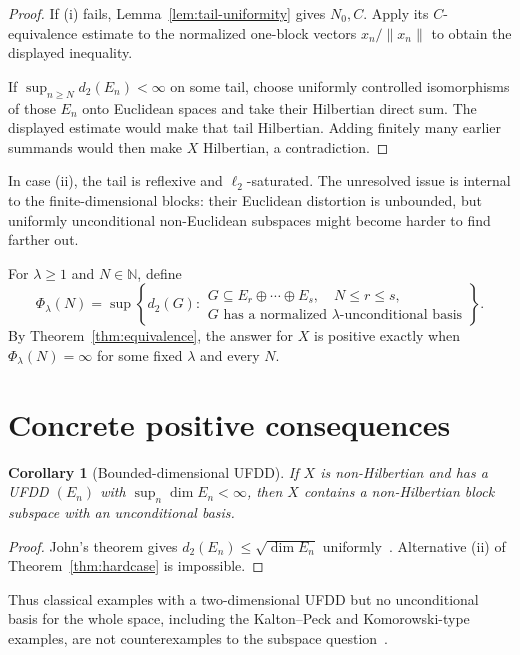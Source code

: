 \documentclass[11pt]{article}
\newtheorem{corollary}[theorem]{Corollary}
\theoremstyle{definition}
\newcommand{\N}{\mathbb N}
\newcommand{\dd}{d_2}
\begin{document}
\begin{proof}
If (i) fails, Lemma~\ref{lem:tail-uniformity} gives $N_0,C$.  Apply its
$C$-equivalence estimate to the normalized one-block vectors
$x_n/\|x_n\|$ to obtain the displayed inequality.

If $\sup_{n\geq N}\dd(E_n)<\infty$ on some tail, choose uniformly controlled
isomorphisms of those $E_n$ onto Euclidean spaces and take their Hilbertian
direct sum.  The displayed estimate would make that tail Hilbertian.  Adding
finitely many earlier summands would then make $X$ Hilbertian, a contradiction.
\end{proof}

In case (ii), the tail is reflexive and $\ell_2$-saturated.  The unresolved
issue is internal to the finite-dimensional blocks: their Euclidean distortion
is unbounded, but uniformly unconditional non-Euclidean subspaces might become
harder to find farther out.

For $\lambda\geq1$ and $N\in\N$, define
\[
 \Phi_\lambda(N)=\sup\left\{\dd(G):
 \begin{array}{l}
 G\subseteq E_r\oplus\cdots\oplus E_s,\quad N\leq r\leq s,\\
 G\text{ has a normalized }\lambda\text{-unconditional basis}
 \end{array}\right\}.
\]
By Theorem~\ref{thm:equivalence}, the answer for $X$ is positive exactly when
$\Phi_\lambda(N)=\infty$ for some fixed $\lambda$ and every $N$.

\section{Concrete positive consequences}

\begin{corollary}[Bounded-dimensional UFDD]\label{cor:bounded-dim}
If $X$ is non-Hilbertian and has a UFDD $(E_n)$ with
$\sup_n\dim E_n<\infty$, then $X$ contains a non-Hilbertian block subspace
with an unconditional basis.
\end{corollary}

\begin{proof}
John's theorem gives $\dd(E_n)\leq\sqrt{\dim E_n}$ uniformly~\cite{AK}.
Alternative (ii) of Theorem~\ref{thm:hardcase} is impossible.
\end{proof}

Thus classical examples with a two-dimensional UFDD but no unconditional basis
for the whole space, including the Kalton--Peck and Komorowski-type examples,
are not counterexamples to the subspace question~\cite{CK,KP,Komorowski}.
\end{document}
